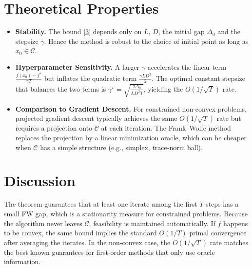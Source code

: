 \documentclass{article}
\newcommand{\Cset}{\mathcal{C}}
\begin{document}
\section*{Theoretical Properties}
\begin{itemize}
\item \textbf{Stability.}  The bound \eqref{3} depends only on $L$, $D$, the initial gap
$\Delta_{0}$ and the stepsize $\gamma$.  Hence the method is robust to the choice of
initial point as long as $x_{0}\in\Cset$.
\item \textbf{Hyperparameter Sensitivity.}  A larger $\gamma$ accelerates the linear term
$\frac{f(x_{0})-f^{*}}{\gamma T}$ but inflates the quadratic term $\frac{\gamma L D^{2}}{2}$.
The optimal constant stepsize that balances the two terms is 
$\gamma^{\star}= \sqrt{\frac{2\Delta_{0}}{L D^{2}T}}$, yielding the $O(1/\sqrt{T})$ rate.
\item \textbf{Comparison to Gradient Descent.}  For constrained non‑convex problems,
projected gradient descent typically achieves the same $O(1/\sqrt{T})$ rate
but requires a projection onto $\Cset$ at each iteration.
The Frank–Wolfe method replaces the projection by a linear minimization oracle,
which can be cheaper when $\Cset$ has a simple structure (e.g., simplex, trace‑norm ball).
\end{itemize}

\section*{Discussion}
The theorem guarantees that at least one iterate among the first $T$ steps
has a small FW gap, which is a stationarity measure for constrained problems.
Because the algorithm never leaves $\Cset$, feasibility is maintained automatically.
If $f$ happens to be convex, the same bound implies the standard $O(1/T)$ primal
convergence after averaging the iterates.  In the non‑convex case, the $O(1/\sqrt{T})$
rate matches the best known guarantees for first‑order methods that only use
oracle information.

\newpage
\end{document}
